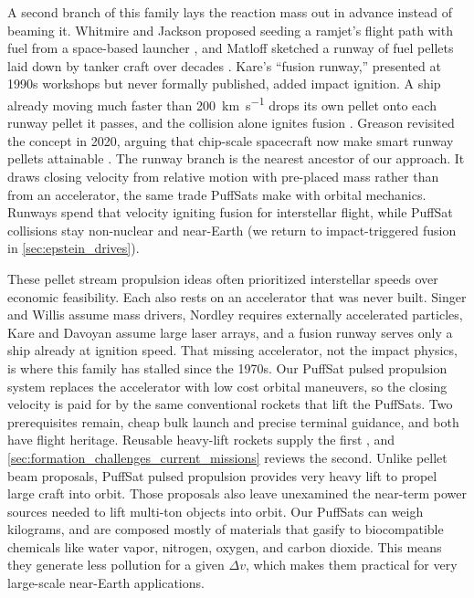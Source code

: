 \documentclass{article}
\newcommand{\deltav}{\Delta v}
\begin{document}
A second branch of this family lays the reaction mass out in advance instead of beaming it. Whitmire and Jackson proposed seeding a ramjet's flight path with fuel from a space-based launcher \cite{whitmire_jackson1977laser_ramjet}, and Matloff sketched a runway of fuel pellets laid down by tanker craft over decades \cite{matloff1979runway}. Kare's ``fusion runway,'' presented at 1990s workshops but never formally published, added impact ignition. A ship already moving much faster than \SI{200}{\kilo\meter\per\second} drops its own pellet onto each runway pellet it passes, and the collision alone ignites fusion \cite{kare1997buzzbomb}. Greason revisited the concept in 2020, arguing that chip-scale spacecraft now make smart runway pellets attainable \cite{greason2020runway}. The runway branch is the nearest ancestor of our approach. It draws closing velocity from relative motion with pre-placed mass rather than from an accelerator, the same trade PuffSats make with orbital mechanics. Runways spend that velocity igniting fusion for interstellar flight, while PuffSat collisions stay non-nuclear and near-Earth (we return to impact-triggered fusion in \autoref{sec:epstein_drives}).

These pellet stream propulsion ideas often prioritized interstellar speeds over economic feasibility.  Each also rests on an accelerator that was never built. Singer and Willis assume mass drivers, Nordley requires externally accelerated particles, Kare and Davoyan assume large laser arrays, and a fusion runway serves only a ship already at ignition speed. That missing accelerator, not the impact physics, is where this family has stalled since the 1970s. Our PuffSat pulsed propulsion system replaces the accelerator with low cost orbital maneuvers, so the closing velocity is paid for by the same conventional rockets that lift the PuffSats. Two prerequisites remain, cheap bulk launch and precise terminal guidance, and both have flight heritage. Reusable heavy-lift rockets supply the first \cite{starship}, and \autoref{sec:formation_challenges_current_missions} reviews the second.  Unlike pellet beam proposals, PuffSat pulsed propulsion provides very heavy lift to propel large craft into orbit.  Those proposals also leave unexamined the near-term power sources needed to lift multi-ton objects into orbit. Our PuffSats can weigh kilograms, and are composed mostly of materials that gasify to biocompatible chemicals like water vapor, nitrogen, oxygen, and carbon dioxide.   This means they generate less pollution for a given $\deltav$, which makes them practical for very large-scale near-Earth applications.
\end{document}
